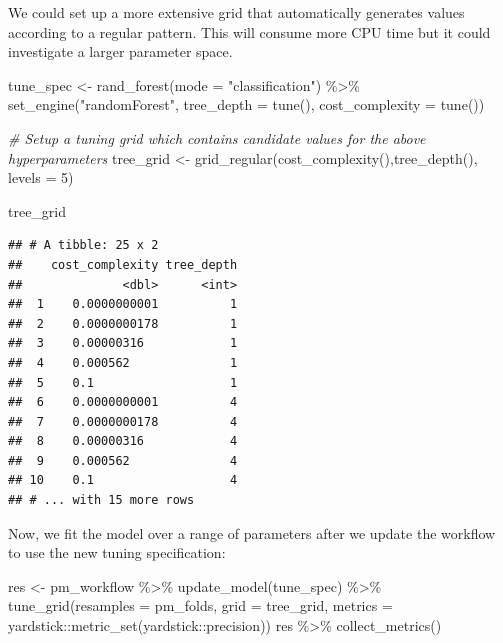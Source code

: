 \documentclass[
]{article}
\newenvironment{Shaded}{\begin{snugshade}}{\end{snugshade}}
\newcommand{\AttributeTok}[1]{\textcolor[rgb]{0.77,0.63,0.00}{#1}}
\newcommand{\CommentTok}[1]{\textcolor[rgb]{0.56,0.35,0.01}{\textit{#1}}}
\newcommand{\DecValTok}[1]{\textcolor[rgb]{0.00,0.00,0.81}{#1}}
\newcommand{\FunctionTok}[1]{\textcolor[rgb]{0.00,0.00,0.00}{#1}}
\newcommand{\NormalTok}[1]{#1}
\newcommand{\OtherTok}[1]{\textcolor[rgb]{0.56,0.35,0.01}{#1}}
\newcommand{\SpecialCharTok}[1]{\textcolor[rgb]{0.00,0.00,0.00}{#1}}
\newcommand{\StringTok}[1]{\textcolor[rgb]{0.31,0.60,0.02}{#1}}
\begin{document}
We could set up a more extensive grid that automatically generates
values according to a regular pattern. This will consume more CPU time
but it could investigate a larger parameter space.

\begin{Shaded}
\begin{Highlighting}[]
\NormalTok{tune\_spec }\OtherTok{\textless{}{-}} 
  \FunctionTok{rand\_forest}\NormalTok{(}\AttributeTok{mode =} \StringTok{"classification"}\NormalTok{) }\SpecialCharTok{\%\textgreater{}\%}
  \FunctionTok{set\_engine}\NormalTok{(}\StringTok{"randomForest"}\NormalTok{, }\AttributeTok{tree\_depth =} \FunctionTok{tune}\NormalTok{(), }\AttributeTok{cost\_complexity =} \FunctionTok{tune}\NormalTok{())}

\CommentTok{\# Setup a tuning grid which contains candidate values for the above hyperparameters}
\NormalTok{tree\_grid }\OtherTok{\textless{}{-}} \FunctionTok{grid\_regular}\NormalTok{(}\FunctionTok{cost\_complexity}\NormalTok{(),}\FunctionTok{tree\_depth}\NormalTok{(),}
                          \AttributeTok{levels =} \DecValTok{5}\NormalTok{)}

\NormalTok{tree\_grid}
\end{Highlighting}
\end{Shaded}

\begin{verbatim}
## # A tibble: 25 x 2
##    cost_complexity tree_depth
##              <dbl>      <int>
##  1    0.0000000001          1
##  2    0.0000000178          1
##  3    0.00000316            1
##  4    0.000562              1
##  5    0.1                   1
##  6    0.0000000001          4
##  7    0.0000000178          4
##  8    0.00000316            4
##  9    0.000562              4
## 10    0.1                   4
## # ... with 15 more rows
\end{verbatim}

Now, we fit the model over a range of parameters after we update the
workflow to use the new tuning specification:

\begin{Shaded}
\begin{Highlighting}[]
\NormalTok{res }\OtherTok{\textless{}{-}}\NormalTok{ pm\_workflow }\SpecialCharTok{\%\textgreater{}\%} 
  \FunctionTok{update\_model}\NormalTok{(tune\_spec) }\SpecialCharTok{\%\textgreater{}\%}
  \FunctionTok{tune\_grid}\NormalTok{(}\AttributeTok{resamples =}\NormalTok{ pm\_folds,}
                  \AttributeTok{grid =}\NormalTok{ tree\_grid,}
                  \AttributeTok{metrics =}\NormalTok{ yardstick}\SpecialCharTok{::}\FunctionTok{metric\_set}\NormalTok{(yardstick}\SpecialCharTok{::}\NormalTok{precision))}
\NormalTok{res }\SpecialCharTok{\%\textgreater{}\%} \FunctionTok{collect\_metrics}\NormalTok{()}
\end{Highlighting}
\end{Shaded}
\end{document}
